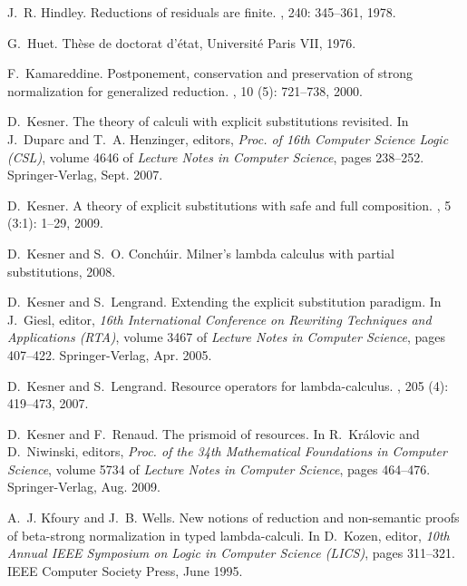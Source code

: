 \documentclass{LMCS}
\renewcommand{\>}{\rightarrow}
\begin{document}
\begin{thebibliography}{10}
J.~R. Hindley.
\newblock Reductions of residuals are finite.
,
  240: 345--361, 1978.

G.~Huet.
\newblock Th\`ese de doctorat d'\'etat, {U}niversit\'e {P}aris VII, 1976.

F.~Kamareddine.
\newblock Postponement, conservation and preservation of strong normalization
  for generalized reduction.
, 10 (5):
  721--738, 2000.

D.~Kesner.
\newblock The theory of calculi with explicit substitutions revisited.
\newblock In J.~Duparc and T.~A. Henzinger, editors, {\em Proc. of 16th
  Computer Science Logic (CSL)}, volume 4646 of {\em Lecture Notes in Computer
  Science}, pages 238--252. Springer-Verlag, Sept. 2007.

D.~Kesner.
\newblock A theory of explicit substitutions with safe and full composition.
, 5 (3:1):
  1--29, 2009.

D.~Kesner and S.~O. Conch\'uir.
\newblock Milner's lambda calculus with partial substitutions, 2008.

D.~Kesner and S.~Lengrand.
\newblock Extending the explicit substitution paradigm.
\newblock In J.~Giesl, editor, {\em 16th International Conference on Rewriting
  Techniques and Applications (RTA)}, volume 3467 of {\em Lecture Notes in
  Computer Science}, pages 407--422. Springer-Verlag, Apr. 2005.

D.~Kesner and S.~Lengrand.
\newblock Resource operators for lambda-calculus.
, 205 (4):
  419--473, 2007.

D.~Kesner and F.~Renaud.
\newblock The prismoid of resources.
\newblock In R.~Kr{\'a}lovic and D.~Niwinski, editors, {\em Proc. of the 34th
  Mathematical Foundations in Computer Science}, volume 5734 of {\em Lecture
  Notes in Computer Science}, pages 464--476. Springer-Verlag, Aug. 2009.

A.~J. Kfoury and J.~B. Wells.
\newblock New notions of reduction and non-semantic proofs of beta-strong
  normalization in typed lambda-calculi.
\newblock In D.~Kozen, editor, {\em 10th Annual {IEEE} Symposium on Logic in
  Computer Science (LICS)}, pages 311--321. IEEE Computer Society Press, June
  1995.


\end{thebibliography}
\end{document}
